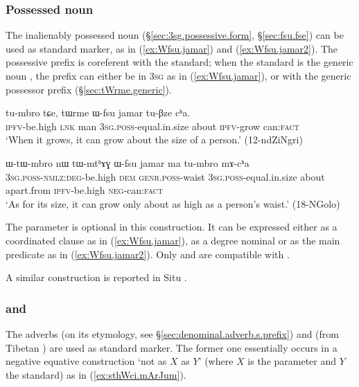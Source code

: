 \subsubsection{Possessed noun} \label{sec:Wfsu.equative}
 
The inalienably possessed noun   (§\ref{sec:3sg.possessive.form}, §\ref{sec:fsu.fse}) can be used as standard marker, as in (\ref{ex:Wfsu.jamar}) and (\ref{ex:Wfsu.jamar2}). The possessive prefix is coreferent with the standard; when the standard is the generic noun , the prefix can either be in \textsc{3sg} as in (\ref{ex:Wfsu.jamar}), or with the generic possessor prefix (§\ref{sec:tWrme.generic}).

\begin{exe}
\ex \label{ex:Wfsu.jamar}
\gll tu-mbro tɕe, tɯrme ɯ-fsu jamar tu-βze cʰa. \\
\textsc{ipfv}-be.high \textsc{lnk}  man \textsc{3sg}.\textsc{poss}-equal.in.size about \textsc{ipfv}-grow can:\textsc{fact} \\
\glt `When it grows, it can grow about the size of a person.' (12-ndZiNgri)
\end{exe}

\begin{exe}
\ex \label{ex:Wfsu.jamar2}
\gll ɯ-tɯ-mbro nɯ tɯ-mtʰɤɣ ɯ-fsu jamar ma tu-mbro mɤ-cʰa \\
\textsc{3sg}.\textsc{poss}-\textsc{nmlz}:\textsc{deg}-be.high \textsc{dem} \textsc{genr}.\textsc{poss}-waist \textsc{3sg}.\textsc{poss}-equal.in.size about apart.from \textsc{ipfv}-be.high \textsc{neg}-can:\textsc{fact} \\
\glt `As for its size, it can grow only about as high as a person's waist.' (18-NGolo)
\end{exe}

The parameter is optional in this construction. It can be expressed either as a coordinated clause as in (\ref{ex:Wfsu.jamar}), as a degree nominal or as the main predicate as in (\ref{ex:Wfsu.jamar2}). Only  and  are compatible with .

A similar construction is reported in Situ \citep[377]{linxr93jiarong}.

 
\subsubsection{ and } \label{sec:sthWci.equative}
The adverbs  (on its etymology, see §\ref{sec:denominal.adverb.s.prefix}) and   (from Tibetan ) are used as standard marker. The former one  essentially occurs in a negative equative construction `not as $X$ as $Y$' (where $X$ is the parameter and $Y$ the standard) as in (\ref{ex:sthWci.mArJum}).

